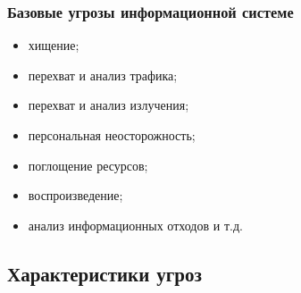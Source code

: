 \begin{frame}
    \frametitle{Базовые угрозы \alert{информационной системе}}

    \begin{itemize}
        \item хищение; 
        \item перехват и анализ трафика; 
        \item перехват и анализ излучения; 
        \item персональная неосторожность; 
        \item поглощение ресурсов; 
        \item воспроизведение; 
        \item анализ информационных отходов и т.д.
    \end{itemize}
\end{frame}

    
\subsection{Характеристики угроз}


